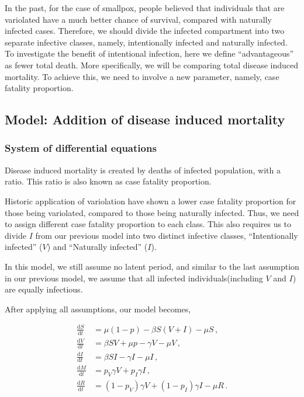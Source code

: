 \documentclass[12pt]{article}
\newcommand\dbyd[2]{\frac{\mathrm d{#1}}{\mathrm d{#2}}}
\newcommand{\pmV}{p_{V}}
\newcommand{\pmI}{p_{I}}
\begin{document}
In the past, for the case of smallpox, people believed that individuals that are variolated have a much better chance of survival, compared with naturally infected cases. Therefore, we should divide the infected compartment into two separate infective classes, namely, intentionally infected and naturally infected. To investigate the benefit of intentional infection, here we define ``advantageous'' as fewer total death. More specifically, we will be comparing total disease induced mortality. To achieve this, we need to involve a new parameter, namely, case fatality proportion.

\subsection{Model: Addition of disease induced mortality}\label{Newborn section}
\subsubsection{System of differential equations}
Disease induced mortality is created by deaths of infected population, with a ratio. This ratio is also known as case fatality proportion. 

Historic application of variolation have shown a lower case fatality proportion for those being variolated, compared to those being naturally infected. Thus, we need to assign different case fatality proportion to each class. This also requires us to divide $I$ from our previous model into two distinct infective classes, ``Intentionally infected'' ($V$) and ``Naturally infected'' ($I$).

In this model, we still assume no latent period, and similar to the last assumption in our previous model, we assume that all infected individuals(including $V$ and $I$) are equally infectious.

After applying all assumptions, our model becomes,
\begin{linenomath*}
\begin{equation}\label{2}
\begin{split}
\dbyd{S}{t}&=\mu(1-p)- \beta S(V+I)-\mu S \,,\\
\dbyd{V}{t}&=\beta SV+\mu p-\gamma V -\mu V\,,\\
\dbyd{I}{t}&=\beta SI-\gamma I -\mu I\,,\\
\dbyd{M}{t}&=\pmV\gamma V+\pmI\gamma I\,,\\
\dbyd{R}{t}&=(1-\pmV)\gamma V+(1-\pmI)\gamma I-\mu R\,.
\end{split}
\end{equation}
\end{linenomath*}
\end{document}
